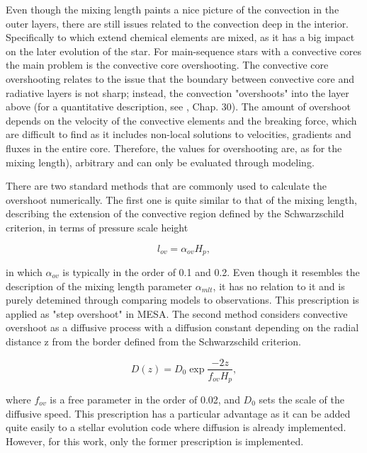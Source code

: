 Even though the mixing length paints a nice picture of the convection in the outer layers, there are still issues related to the convection deep in the interior. Specifically to which extend chemical elements are mixed, as it has a big impact on the later evolution of the star. For main-sequence stars with a convective cores the main problem is the convective core overshooting. The convective core overshooting relates to the issue that the boundary between convective core and radiative layers is not sharp; instead, the convection "overshoots" into the layer above (for a quantitative description, see \citet{kippenhahn1990stellar}, Chap. 30). The amount of overshoot depends on the velocity of the convective elements and the breaking force, which are difficult to find as it includes non-local solutions to velocities, gradients and fluxes in the entire core. Therefore, the values for overshooting are, as for the mixing length), arbitrary and can only be evaluated through modeling. 

There are two standard methods that are commonly used to calculate the overshoot numerically. The first one is quite similar to that of the mixing length, describing the extension of the convective region defined by the Schwarzschild criterion, in terms of pressure scale height

\begin{equation}
    l_{ov} = \alpha_{ov}H_p,  
\end{equation}

\noindent in which $\alpha_{ov}$ is typically in the order of 0.1 and 0.2. Even though it resembles the description of the mixing length parameter $\alpha_{mlt}$, it has no relation to it and is purely detemined through comparing models to observations. This prescription is applied as "step overshoot" in MESA. The second method considers convective overshoot as a diffusive process with a diffusion constant depending on the radial distance z from the border defined from the Schwarzschild criterion. 

\begin{equation}
    D(z) = D_0 \exp{\frac{-2z}{f_{ov}H_p}},
\end{equation}

\noindent where $f_{ov}$ is a free parameter in the order of 0.02, and $D_0$ sets the scale of the diffusive speed. This prescription has a particular advantage as it can be added quite easily to a stellar evolution code where diffusion is already implemented. However, for this work, only the former prescription is implemented.

